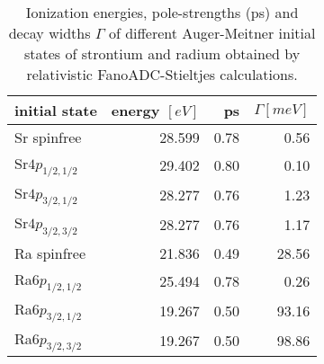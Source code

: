 \begin{table}[htb]
 \centering
 \caption{Ionization energies, pole-strengths (ps) and decay widths $\Gamma$ of
          different Auger-Meitner initial states of strontium and radium obtained
          by relativistic FanoADC-Stieltjes calculations.}
 \begin{tabular}{lrrr}
  \toprule
   initial state    & energy $[\unit{eV}]$ & ps & $\Gamma [\unit{meV}]$\\
  \midrule
   Sr spinfree      & 28.599 & 0.78 &   0.56\\  
   Sr$4p_{1/2,1/2}$ & 29.402 & 0.80 &   0.10\\
   Sr$4p_{3/2,1/2}$ & 28.277 & 0.76 &   1.23\\
   Sr$4p_{3/2,3/2}$ & 28.277 & 0.76 &   1.17\\
  \midrule
   Ra spinfree      & 21.836 & 0.49 &  28.56 \\  
   Ra$6p_{1/2,1/2}$ & 25.494 & 0.78 &   0.26\\
   Ra$6p_{3/2,1/2}$ & 19.267 & 0.50 &  93.16 \\
   Ra$6p_{3/2,3/2}$ & 19.267 & 0.50 &  98.86\\
  \bottomrule
 \end{tabular}
 \label{tab:widths}
\end{table}
